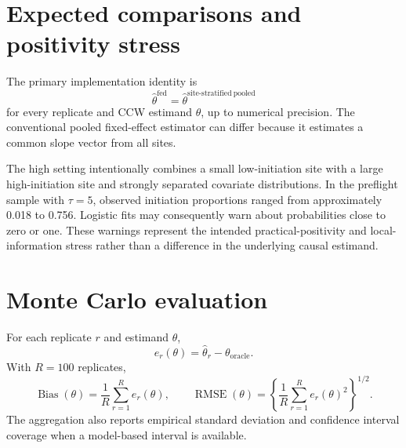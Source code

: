 \documentclass[11pt]{article}
\begin{document}
\section{Expected comparisons and positivity stress}

The primary implementation identity is
\[
  \widehat\theta^{\mathrm{fed}}
  =\widehat\theta^{\mathrm{site\mbox{-}stratified\ pooled}}
\]
for every replicate and CCW estimand $\theta$, up to numerical precision.
The conventional pooled fixed-effect estimator can differ because it estimates
a common slope vector from all sites.

The high setting intentionally combines a small low-initiation site with a
large high-initiation site and strongly separated covariate distributions. In
the preflight sample with $\tau=5$, observed initiation proportions ranged
from approximately 0.018 to 0.756. Logistic fits may consequently warn about
probabilities close to zero or one. These warnings represent the intended
practical-positivity and local-information stress rather than a difference in
the underlying causal estimand.

\section{Monte Carlo evaluation}

For each replicate $r$ and estimand $\theta$,
\[
  e_r(\theta)=\widehat\theta_r-\theta_{\mathrm{oracle}}.
\]
With $R=100$ replicates,
\[
  \operatorname{Bias}(\theta)
  =\frac{1}{R}\sum_{r=1}^Re_r(\theta),
  \qquad
  \operatorname{RMSE}(\theta)
  =\left\{\frac{1}{R}\sum_{r=1}^Re_r(\theta)^2\right\}^{1/2}.
\]
The aggregation also reports empirical standard deviation and confidence
interval coverage when a model-based interval is available.
\end{document}
